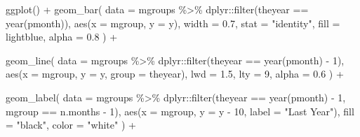 \documentclass[
]{article}
\newenvironment{Shaded}{\begin{snugshade}}{\end{snugshade}}
\newcommand{\AttributeTok}[1]{\textcolor[rgb]{0.77,0.63,0.00}{#1}}
\newcommand{\DecValTok}[1]{\textcolor[rgb]{0.00,0.00,0.81}{#1}}
\newcommand{\FloatTok}[1]{\textcolor[rgb]{0.00,0.00,0.81}{#1}}
\newcommand{\FunctionTok}[1]{\textcolor[rgb]{0.00,0.00,0.00}{#1}}
\newcommand{\NormalTok}[1]{#1}
\newcommand{\SpecialCharTok}[1]{\textcolor[rgb]{0.00,0.00,0.00}{#1}}
\newcommand{\StringTok}[1]{\textcolor[rgb]{0.31,0.60,0.02}{#1}}
\begin{document}
\begin{Shaded}
\begin{Highlighting}[]
\FunctionTok{ggplot}\NormalTok{() }\SpecialCharTok{+}
  \FunctionTok{geom\_bar}\NormalTok{(}
    \AttributeTok{data =}\NormalTok{ mgroups }\SpecialCharTok{\%\textgreater{}\%}\NormalTok{ dplyr}\SpecialCharTok{::}\FunctionTok{filter}\NormalTok{(theyear }\SpecialCharTok{==} \FunctionTok{year}\NormalTok{(pmonth)),}
    \FunctionTok{aes}\NormalTok{(}\AttributeTok{x =}\NormalTok{ mgroup, }\AttributeTok{y =}\NormalTok{ y),}
    \AttributeTok{width =} \FloatTok{0.7}\NormalTok{,}
    \AttributeTok{stat =} \StringTok{"identity"}\NormalTok{,}
    \AttributeTok{fill =}\NormalTok{ lightblue,}
    \AttributeTok{alpha =} \FloatTok{0.8}
\NormalTok{  ) }\SpecialCharTok{+}
  
  \FunctionTok{geom\_line}\NormalTok{(}
    \AttributeTok{data =}\NormalTok{ mgroups }\SpecialCharTok{\%\textgreater{}\%}\NormalTok{ dplyr}\SpecialCharTok{::}\FunctionTok{filter}\NormalTok{(theyear }\SpecialCharTok{==} \FunctionTok{year}\NormalTok{(pmonth) }\SpecialCharTok{{-}} \DecValTok{1}\NormalTok{),}
    \FunctionTok{aes}\NormalTok{(}\AttributeTok{x =}\NormalTok{ mgroup, }\AttributeTok{y =}\NormalTok{ y, }\AttributeTok{group =}\NormalTok{ theyear),}
    \AttributeTok{lwd =} \FloatTok{1.5}\NormalTok{,}
    \AttributeTok{lty =} \DecValTok{9}\NormalTok{,}
    \AttributeTok{alpha =} \FloatTok{0.6}
\NormalTok{  ) }\SpecialCharTok{+}
  
  \FunctionTok{geom\_label}\NormalTok{(}
    \AttributeTok{data =}\NormalTok{ mgroups }\SpecialCharTok{\%\textgreater{}\%}\NormalTok{ dplyr}\SpecialCharTok{::}\FunctionTok{filter}\NormalTok{(theyear }\SpecialCharTok{==} \FunctionTok{year}\NormalTok{(pmonth) }\SpecialCharTok{{-}} \DecValTok{1}\NormalTok{, mgroup }\SpecialCharTok{==}\NormalTok{ n.months }\SpecialCharTok{{-}} \DecValTok{1}\NormalTok{),}
    \FunctionTok{aes}\NormalTok{(}\AttributeTok{x =}\NormalTok{ mgroup, }\AttributeTok{y =}\NormalTok{ y }\SpecialCharTok{{-}} \DecValTok{10}\NormalTok{, }\AttributeTok{label =} \StringTok{"Last Year"}\NormalTok{),}
    \AttributeTok{fill =} \StringTok{"black"}\NormalTok{,}
    \AttributeTok{color =} \StringTok{"white"}
\NormalTok{  ) }\SpecialCharTok{+}
  

\end{Highlighting}
\end{Shaded}
\end{document}
